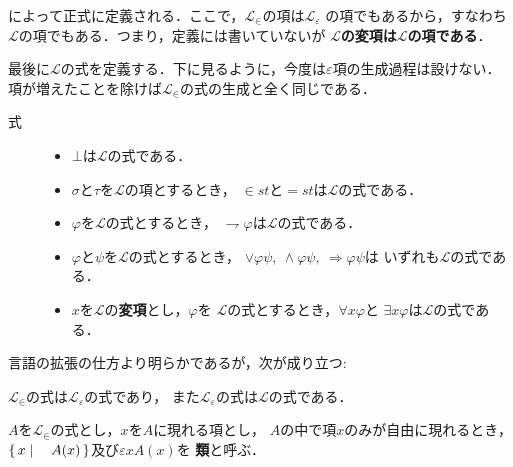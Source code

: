 	によって正式に定義される．ここで，$\mathcal{L}_{\in}$の項は$\mathcal{L}_{\varepsilon}$
	の項でもあるから，すなわち$\mathcal{L}$の項でもある．つまり，定義には書いていないが
	{\bf $\mathcal{L}$の変項は$\mathcal{L}$の項である}．
	
	最後に$\mathcal{L}$の式を定義する．下に見るように，今度は$\varepsilon$項の生成過程は設けない．
	項が増えたことを除けば$\mathcal{L}_{\in}$の式の生成と全く同じである．
	
	\begin{description}
		\item[式] 
			\begin{itemize}
				\item $\bot$は$\mathcal{L}$の式である．
				\item $\sigma$と$\tau$を$\mathcal{L}$の項とするとき，
					$\in st$と$=st$は$\mathcal{L}$の式である．
				\item $\varphi$を$\mathcal{L}$の式とするとき，
					$\rightharpoondown \varphi$は$\mathcal{L}$の式である．
				\item $\varphi$と$\psi$を$\mathcal{L}$の式とするとき，
					$\vee \varphi \psi,\ \wedge \varphi \psi,\ \Longrightarrow \varphi \psi$は
					いずれも$\mathcal{L}$の式である．
				\item $x$を$\mathcal{L}$の{\bf 変項}とし，$\varphi$を
					$\mathcal{L}$の式とするとき，$\forall x \varphi$と
					$\exists x \varphi$は$\mathcal{L}$の式である．
			\end{itemize}
	\end{description}
	
	言語の拡張の仕方より明らかであるが，次が成り立つ:
	
	\begin{screen}
		\begin{metathm}
			$\mathcal{L}_{\in}$の式は$\mathcal{L}_{\varepsilon}$の式であり，
			また$\mathcal{L}_{\varepsilon}$の式は$\mathcal{L}$の式である．
		\end{metathm}
	\end{screen}
	
	\begin{screen}
		\begin{dfn}[類]
			$A$を$\mathcal{L}_{\in}$の式とし，$x$を$A$に現れる項とし，
			$A$の中で項$x$のみが自由に現れるとき，
			$\left\{\, x \mid \quad A(x)\, \right\}$及び$\varepsilon x A(x)$を
			{\bf 類}\index{るい@類}{\bf (class)}と呼ぶ．
		\end{dfn}
	\end{screen}
	
